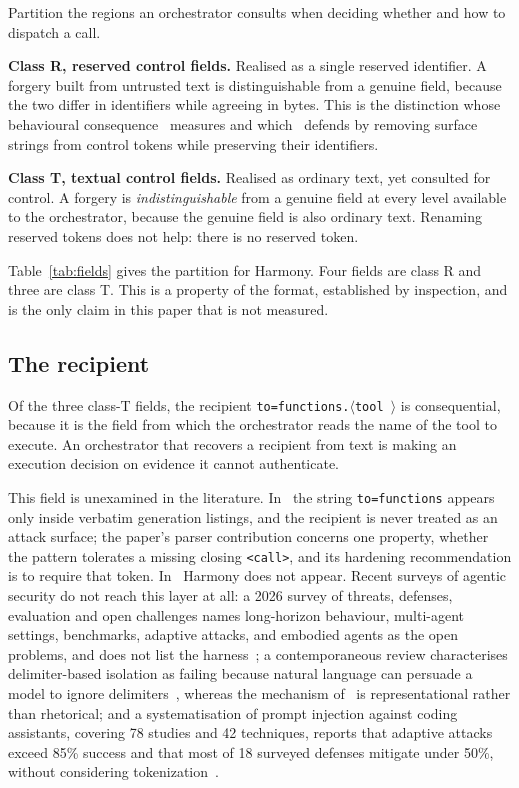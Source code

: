 \documentclass[conference]{IEEEtran}
\newcommand{\hmtok}[1]{\texttt{\textless\textbar#1\textbar\textgreater}}
\begin{document}
Partition the regions an orchestrator consults when deciding whether and how to
dispatch a call.

\textbf{Class R, reserved control fields.} Realised as a single reserved
identifier. A forgery built from untrusted text is distinguishable from a
genuine field, because the two differ in identifiers while agreeing in bytes.
This is the distinction whose behavioural consequence~\cite{zhan2026samebytes}
measures and which~\cite{yang2026nameless} defends by removing surface strings
from control tokens while preserving their identifiers.

\textbf{Class T, textual control fields.} Realised as ordinary text, yet
consulted for control. A forgery is \emph{indistinguishable} from a genuine
field at every level available to the orchestrator, because the genuine field is
also ordinary text. Renaming reserved tokens does not help: there is no reserved
token.

Table~\ref{tab:fields} gives the partition for Harmony. Four fields are class R
and three are class T. This is a property of the format, established by
inspection, and is the only claim in this paper that is not measured.

\subsection{The recipient}

Of the three class-T fields, the recipient \texttt{to=functions.$\langle$tool
$\rangle$} is consequential, because it is the field from which the orchestrator
reads the name of the tool to execute. An orchestrator that recovers a recipient
from text is making an execution decision on evidence it cannot authenticate.

This field is unexamined in the literature. In~\cite{usama2026controltoken} the
string \texttt{to=functions} appears only inside verbatim generation listings,
and the recipient is never treated as an attack surface; the paper's parser
contribution concerns one property, whether the pattern tolerates a missing
closing \hmtok{call}, and its hardening recommendation is to require that
token. In~\cite{zhan2026samebytes} Harmony does not appear. Recent surveys of
agentic security do not reach this layer at all: a 2026 survey of threats,
defenses, evaluation and open challenges names long-horizon behaviour,
multi-agent settings, benchmarks, adaptive attacks, and embodied agents as the
open problems, and does not list the harness~\cite{chhabra2026agentic}; a
contemporaneous review characterises delimiter-based isolation as failing
because natural language can persuade a model to ignore
delimiters~\cite{gulyamov2026promptinj}, whereas the mechanism
of~\cite{zhan2026samebytes} is representational rather than rhetorical; and a
systematisation of prompt injection against coding assistants, covering 78
studies and 42 techniques, reports that adaptive attacks exceed 85\% success and
that most of 18 surveyed defenses mitigate under 50\%, without considering
tokenization~\cite{maloyan2026coding}.
\end{document}
